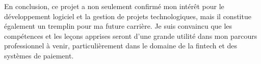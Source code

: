 En conclusion, ce projet a non seulement confirmé mon intérêt pour le développement logiciel et la gestion de projets technologiques, mais il constitue également un tremplin pour ma future carrière. Je suis convaincu que les compétences et les leçons apprises seront d'une grande utilité dans mon parcours professionnel à venir, particulièrement dans le domaine de la fintech et des systèmes de paiement.